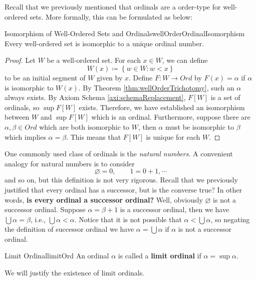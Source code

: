 \documentclass[math]{amznotes}
\theoremstyle{remark}
\begin{document}
Recall that we previously mentioned that ordinals are a order-type for well-ordered sets. More formally, this can be formulated as below:
\begin{thmbox}{Isomorphism of Well-Ordered Sets and Ordinals}{wellOrderOrdinalIsomorphism}
    Every well-ordered set is isomorphic to a unique ordinal number.
    \tcblower
    \begin{proof}
        Let $W$ be a well-ordered set. For each $x \in W$, we can define 
        \begin{equation*}
            W(x) \coloneqq \left\{w \in W \colon w < x\right\}
        \end{equation*} 
        to be an initial segment of $W$ given by $x$. Define $F \colon W \to Ord$ by $F(x) = \alpha$ if $\alpha$ is isomorphic to $W(x)$. By Theorem \ref{thm:wellOrderTrichotomy}, such an $\alpha$ always exists. By Axiom Schema \ref{axi:schemaReplacement}, $F[W]$ is a set of ordinals, so $\sup F[W]$ exists. Therefore, we have established an isomorphism between $W$ and $\sup F[W]$ which is an ordinal. Furthermore, suppose there are $\alpha, \beta \in Ord$ which are both isomorphic to $W$, then $\alpha$ must be isomorphic to $\beta$ which implies $\alpha = \beta$. This means that $F[W]$ is unique for each $W$.
    \end{proof}
\end{thmbox}
One commonly used class of ordinals is the \textit{natural numbers}. A convenient analogy for natural numbers is to consider
\begin{equation*}
    \varnothing = 0, \qquad 1 = 0 + 1, \cdots
\end{equation*}
and so on, but this definition is not very rigorous. Recall that we previously justified that every ordinal has a successor, but is the converse true? In other words, \textbf{is every ordinal a successor ordinal?} Well, obviously $\varnothing$ is not a successor ordinal. Suppose $\alpha = \beta + 1$ is a successor ordinal, then we have $\bigcup\alpha = \beta$, i.e., $\bigcup\alpha < \alpha$. Notice that it is not possible that $\alpha < \bigcup\alpha$, so negating the definition of successor ordinal we have $\alpha = \bigcup\alpha$ if $\alpha$ is not a successor ordinal.
\begin{dfnbox}{Limit Ordinal}{limitOrd}
    An ordinal $\alpha$ is called a {\color{red} \textbf{limit ordinal}} if $\alpha = \sup\alpha$.
\end{dfnbox}
We will justify the existence of limit ordinals. 
\end{document}
